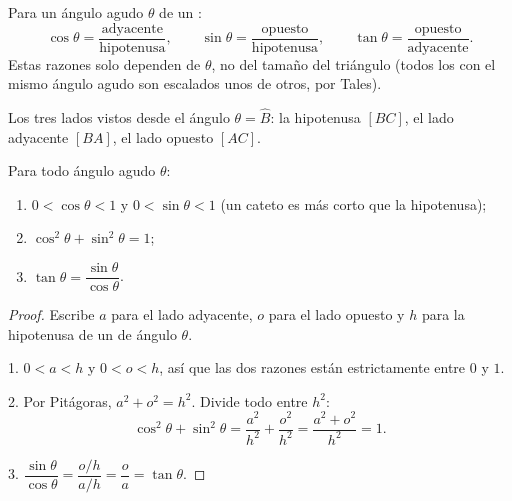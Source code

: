 \begin{definition}\label{def:g9:trig:ratios}
Para un ángulo agudo $\theta$ de un :
\[
\cos\theta = \frac{\text{adyacente}}{\text{hipotenusa}},
\qquad
\sin\theta = \frac{\text{opuesto}}{\text{hipotenusa}},
\qquad
\tan\theta = \frac{\text{opuesto}}{\text{adyacente}} .
\]
Estas razones solo dependen de
$\theta$, no del tamaño del triángulo (todos los  con el
mismo ángulo agudo son escalados unos de otros, por Tales).
\end{definition}

\begin{omfigure}

{\small Los tres lados vistos desde el ángulo $\theta = \widehat B$: la
hipotenusa $[BC]$, el lado adyacente $[BA]$, el lado opuesto $[AC]$.}
\end{omfigure}

\begin{proposition}\label{prop:g9:trig:properties}
Para todo ángulo agudo $\theta$:
\begin{enumerate}
  \item $0 < \cos\theta < 1$ y $0 < \sin\theta < 1$ (un cateto es más corto
        que la hipotenusa);
  \item $\cos^2\theta + \sin^2\theta = 1$;
  \item $\tan\theta = \dfrac{\sin\theta}{\cos\theta}$.
\end{enumerate}
\end{proposition}

\begin{proof}
Escribe $a$ para el lado adyacente, $o$ para el lado opuesto y $h$ para la
hipotenusa de un  de ángulo $\theta$.

1. $0 < a < h$ y $0 < o < h$, así que las dos razones están estrictamente entre
$0$ y $1$.

2. Por Pitágoras, $a^2 + o^2 = h^2$. Divide todo entre $h^2$:
\[
\cos^2\theta + \sin^2\theta
= \frac{a^2}{h^2} + \frac{o^2}{h^2}
= \frac{a^2 + o^2}{h^2} = 1 .
\]

3. $\dfrac{\sin\theta}{\cos\theta} = \dfrac{o/h}{a/h} = \dfrac oa
= \tan\theta$.
\end{proof}

